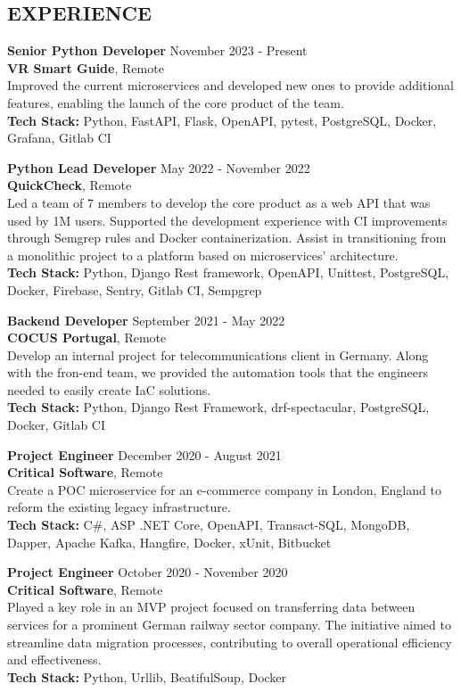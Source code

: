 \documentclass[margin, 10pt]{res} %
\begin{document}
\begin{resume}
    \section{EXPERIENCE}


    \textbf{Senior Python Developer} \hfill November 2023 - Present\\
    \textbf{VR Smart Guide}, Remote\\
    Improved the current microservices and developed new ones to provide additional features, enabling the launch of the core product of the team.\\
    \textbf {Tech Stack:} Python, FastAPI, Flask, OpenAPI, pytest, PostgreSQL, Docker, Grafana, Gitlab CI

    \textbf{Python Lead Developer} \hfill May 2022 - November 2022\\
    \textbf{QuickCheck}, Remote\\
    Led a team of 7 members to develop the core product as a web API that was used by 1M users. Supported the development experience with CI improvements through Semgrep rules and Docker containerization. Assist in transitioning from a monolithic project to a platform based on microservices' architecture.\\
    \textbf {Tech Stack:} Python, Django Rest framework, OpenAPI, Unittest, PostgreSQL, Docker, Firebase, Sentry, Gitlab CI, Sempgrep


    \textbf{Backend Developer} \hfill September 2021 - May 2022\\
    \textbf{COCUS Portugal}, Remote\\
    Develop an internal project for telecommunications client in Germany. Along with the fron-end team, we provided the automation tools that the engineers needed to easily create IaC solutions.\\
    \textbf {Tech Stack:} Python, Django Rest Framework, drf-spectacular, PostgreSQL, Docker, Gitlab CI


    \textbf{Project Engineer} \hfill December 2020 - August 2021\\
    \textbf{Critical Software}, Remote\\
    Create a POC microservice for an e-commerce company in London, England to reform the existing legacy infrastructure.\\
    \textbf {Tech Stack:} C\#, ASP .NET Core, OpenAPI, Transact-SQL, MongoDB, Dapper, Apache Kafka, Hangfire, Docker, xUnit, Bitbucket


    \textbf{Project Engineer} \hfill October 2020 - November 2020\\
    \textbf{Critical Software}, Remote\\
    Played a key role in an MVP project focused on transferring data between services for a prominent German railway sector company. The initiative aimed to streamline data migration processes, contributing to overall operational efficiency and effectiveness.\\
    \textbf {Tech Stack:} Python, Urllib, BeatifulSoup, Docker



\end{resume}
\end{document}
